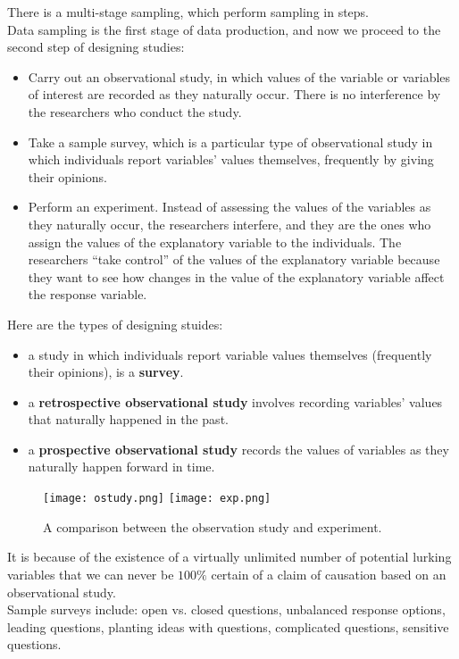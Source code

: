 \documentclass[10pt, a4paper]{article}
\begin{document}
There is a multi-stage sampling, which perform sampling in steps.\\
Data sampling is the first stage of data production, and now we proceed to the second step of designing studies:
\begin{itemize}
\item Carry out an observational study, in which values of the variable or variables of interest are recorded as they naturally occur. There is no interference by the researchers who conduct the study.
\item Take a sample survey, which is a particular type of observational study in which individuals report variables' values themselves, frequently by giving their opinions.
\item Perform an experiment. Instead of assessing the values of the variables as they naturally occur, the researchers interfere, and they are the ones who assign the values of the explanatory variable to the individuals. The researchers ``take control'' of the values of the explanatory variable because they want to see how changes in the value of the explanatory variable affect the response variable.
\end{itemize}
Here are the types of designing stuides:
\begin{itemize}
    \item a study in which individuals report variable values themselves (frequently their opinions), is a \textbf{survey}.
    \item a \textbf{retrospective observational study} involves recording variables' values that naturally happened in the past.
    \item a \textbf{prospective observational study} records the values of variables as they naturally happen forward in time.
\end{itemize}
\begin{figure}
    [h!]
    \centering
    \texttt{[image: ostudy.png]}
    \texttt{[image: exp.png]}
    \caption{A comparison between the observation study and experiment.}
\end{figure}
It is because of the existence of a virtually unlimited number of potential lurking variables that we can never be $100\%$ certain of a claim of causation based on an observational study.\\
Sample surveys include: open vs. closed questions, unbalanced response options, leading questions, planting ideas with questions, complicated questions, sensitive questions.\par
\end{document}
